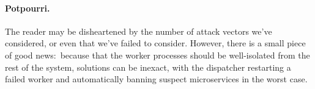 \paragraph{Potpourri.}
The reader may be disheartened by the number of attack vectors we've considered, or
even that we've failed to consider.  However, there is a small piece of good news:\
because that the worker processes should be well-isolated from the rest of the
system, solutions can be inexact, with the dispatcher restarting a failed worker and
automatically banning suspect microservices in the worst case.
